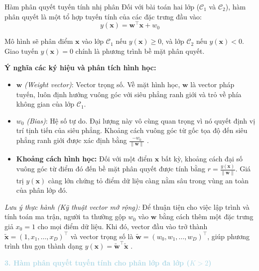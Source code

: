 \begin{importantbox}{Hàm phân quyết tuyến tính nhị phân}
Đối với bài toán hai lớp ($\mathcal{C}_1$ và $\mathcal{C}_2$), hàm phân quyết là một tổ hợp tuyến tính của các đặc trưng đầu vào:
\begin{equation}
    y(\mathbf{x}) = \mathbf{w}^\top \mathbf{x} + w_0
\end{equation}

Mô hình sẽ phân điểm $\mathbf{x}$ vào lớp $\mathcal{C}_1$ nếu $y(\mathbf{x}) \ge 0$, và lớp $\mathcal{C}_2$ nếu $y(\mathbf{x}) < 0$. Giao tuyến $y(\mathbf{x}) = 0$ chính là phương trình bề mặt phân quyết.
\end{importantbox}

\textbf{Ý nghĩa các ký hiệu và phân tích hình học:}
\begin{itemize} [labelsep=10pt, leftmargin=2cm]
    \item $\mathbf{w}$ \textit{(Weight vector)}: Vector trọng số. Về mặt hình học, $\mathbf{w}$ là vector pháp tuyến, luôn định hướng vuông góc với siêu phẳng ranh giới và trỏ về phía không gian của lớp $\mathcal{C}_1$.
    \item $w_0$ \textit{(Bias)}: Hệ số tự do. Đại lượng này vô cùng quan trọng vì nó quyết định vị trí tịnh tiến của siêu phẳng. Khoảng cách vuông góc từ gốc tọa độ đến siêu phẳng ranh giới được xác định bằng $\frac{-w_0}{\|\mathbf{w}\|}$ \cite{bishop2006pattern}.
    \item \textbf{Khoảng cách hình học:} Đối với một điểm $\mathbf{x}$ bất kỳ, khoảng cách đại số vuông góc từ điểm đó đến bề mặt phân quyết được tính bằng $r = \frac{y(\mathbf{x})}{\|\mathbf{w}\|}$. Giá trị $y(\mathbf{x})$ càng lớn chứng tỏ điểm dữ liệu càng nằm sâu trong vùng an toàn của phân lớp đó.
\end{itemize}

\textit{Lưu ý thực hành (Kỹ thuật vector mở rộng):} Để thuận tiện cho việc lập trình và tính toán ma trận, người ta thường gộp $w_0$ vào $\mathbf{w}$ bằng cách thêm một đặc trưng giả $x_0 = 1$ cho mọi điểm dữ liệu. Khi đó, vector đầu vào trở thành $\tilde{\mathbf{x}} = (1, x_1, \dots, x_D)^\top$ và vector trọng số là $\tilde{\mathbf{w}} = (w_0, w_1, \dots, w_D)^\top$, giúp phương trình thu gọn thành dạng $y(\mathbf{x}) = \tilde{\mathbf{w}}^\top \tilde{\mathbf{x}}$ \cite{goodfellow2016deep}.

\vspace{0.5em}
\noindent\textcolor{lightblue}{\textbf{3. Hàm phân quyết tuyến tính cho phân lớp đa lớp ($K > 2$)}}
\vspace{0.5em}



